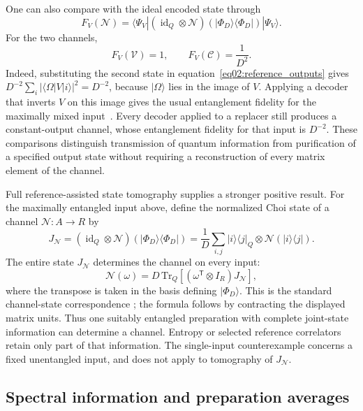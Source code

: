 \documentclass[11pt,letterpaper]{article}
\theoremstyle{plain}
\theoremstyle{definition}
\theoremstyle{remark}
\newcommand{\Ccal}{\mathcal{C}}
\newcommand{\Ncal}{\mathcal{N}}
\newcommand{\Vcal}{\mathcal{V}}
\begin{document}
One can also compare with the ideal encoded state through
\begin{equation}
 F_V(\Ncal)=\langle\Psi_V|
 (\operatorname{id}_Q\otimes\Ncal)
 (|\Phi_D\rangle\langle\Phi_D|)|\Psi_V\rangle.
 \label{eq02:encoding_fidelity}
\end{equation}
For the two channels,
\begin{equation}
 F_V(\Vcal)=1,
 \qquad F_V(\Ccal)=\frac1{D^2}.
 \label{eq02:reference_fidelities}
\end{equation}
Indeed, substituting the second state in
equation~\eqref{eq02:reference_outputs} gives
$D^{-2}\sum_i|\langle\Omega|V|i\rangle|^2=D^{-2}$, because
$|\Omega\rangle$ lies in the image of $V$. Applying a decoder that
inverts $V$ on this image gives the usual entanglement fidelity for
the maximally mixed input~\citep{schumacher1996}. Every decoder applied
to a replacer still produces a constant-output channel, whose
entanglement fidelity for that input is $D^{-2}$. These comparisons
distinguish transmission of quantum information from purification of a
specified output state without requiring a reconstruction of every
matrix element of the channel.

Full reference-assisted state tomography supplies a stronger positive
result. For the maximally entangled input above, define the normalized
Choi state of a channel $\Ncal:A\to R$ by
\begin{equation}
 J_{\Ncal}=(\operatorname{id}_Q\otimes\Ncal)
 (|\Phi_D\rangle\langle\Phi_D|)
 =\frac1D\sum_{i,j}|i\rangle\langle j|_Q
       \otimes\Ncal(|i\rangle\langle j|).
 \label{eq02:choi_state}
\end{equation}
The entire state $J_{\Ncal}$ determines the channel on every input:
\begin{equation}
 \Ncal(\omega)=D\,\mathrm{Tr}_Q
       [(\omega^{\mathsf T}\otimes I_R)J_{\Ncal}],
 \label{eq02:choi_inversion}
\end{equation}
where the transpose is taken in the basis defining $|\Phi_D\rangle$.
This is the standard channel-state correspondence \cite{choi1975}; the
formula follows by contracting the displayed matrix units. Thus one
suitably entangled preparation with complete joint-state information
can determine a channel. Entropy or selected reference correlators
retain only part of that information. The single-input counterexample
concerns a fixed unentangled input, and does not apply to tomography of
$J_{\Ncal}$.

\subsection{Spectral information and preparation averages}
\label{subsec02:spectral_limitations}
\end{document}
